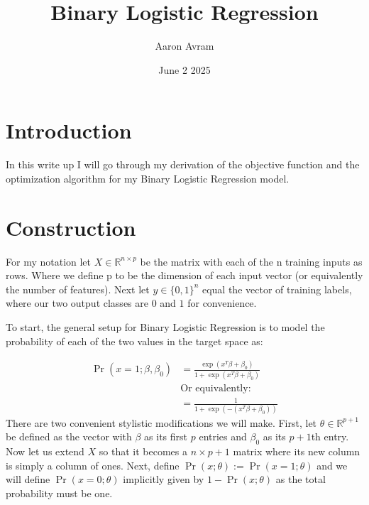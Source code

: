 \documentclass[12pt]{article}
\title{Binary Logistic Regression}
\author{Aaron Avram}
\date{June 2 2025}
\begin{document}
\maketitle

\section*{Introduction}
In this write up I will go through my derivation of the objective function and the optimization algorithm for my Binary
Logistic Regression model.

\section*{Construction}
For my notation let $X \in \mathbb{R}^{n \times p}$ be the matrix
with each of the n training inputs as rows. Where we define p to be the dimension
of each input vector (or equivalently the number of features). Next
let $y \in \{0, 1\}^n$ equal the vector of training labels, where our two
output classes are $0$ and $1$ for convenience.


To start, the general setup for Binary Logistic Regression is to model the probability of each of the two values in the target space as:

\begin{align*}
    \Pr(x = 1; \beta, \beta_0) &= \frac{\exp(x^T\beta + \beta_0)}{1 +\exp(x^T\beta + \beta_0)} \\
    &\text{Or equivalently:} \\
    &= \frac{1}{1 + \exp(-(x^T\beta + \beta_0))}
\end{align*}
There are two convenient stylistic modifications we will make. 
First, let $\theta \in \mathbb{R}^{p+1}$ be defined as the vector with
$\beta$ as its first $p$ entries and $\beta_0$ as its $p + 1$th entry.
Now let us extend $X$ so that it becomes a $n \times p + 1$ matrix where
its new column is simply a column of ones. Next, define $\Pr(x; \theta) := \Pr(x = 1; \theta)$
and we will define $\Pr(x = 0; \theta)$ implicitly given by $1 - \Pr(x; \theta)$
as the total probability must be one.
\end{document}
